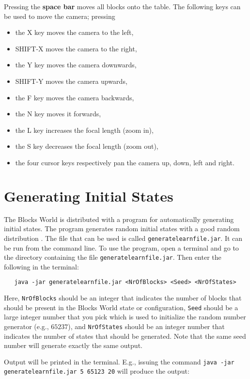 \documentclass{article}
\begin{document}
Pressing the \textbf{space bar} moves all blocks onto the table. The following keys can be used to move the camera; pressing
\begin{itemize}
	\item the X key moves the camera to the left,
	\item SHIFT-X moves the camera to the right,
	\item the Y key moves the camera downwards,
	\item SHIFT-Y moves the camera upwards,
	\item the F key moves the camera backwards,
	\item the N key moves it forwards,
	\item the L key increases the focal length (zoom in),
	\item the S key decreases the focal length (zoom out),
	\item the four cursor keys respectively pan the camera up, down, left and right.
\end{itemize}


%
%
\section{Generating Initial States}
%
The Blocks World is distributed with a program for automatically generating initial states. The program generates random initial states with a good random distribution \cite{Sla01}. The file that can be used is called \texttt{generatelearnfile.jar}. It can be run from the command line. To use the program, open a terminal and go to the directory 
containing the file \texttt{generatelearnfile.jar}. Then enter the following in the terminal:
\begin{verbatim}
   java -jar generatelearnfile.jar <NrOfBlocks> <Seed> <NrOfStates>
\end{verbatim}

Here, \texttt{NrOfBlocks} should be an integer that indicates the number of blocks that should be present in the Blocks World state or configuration, \texttt{Seed} should be a large integer number that you pick which is used to initialize the random number generator (e.g., $65237$), and \texttt{NrOfStates} should be an integer number that indicates the number of states that should be generated. Note that the same seed number will generate exactly the same output.

Output will be printed in the terminal. E.g., issuing the command \texttt{java -jar generatelearnfile.jar 5 65123 20} will produce the output:
\end{document}
